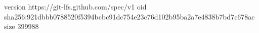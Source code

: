 version https://git-lfs.github.com/spec/v1
oid sha256:921dbbb0788520f5394bcbc91dc754e23c76d102b95ba2a7e4838b7bd7c678ac
size 399988
